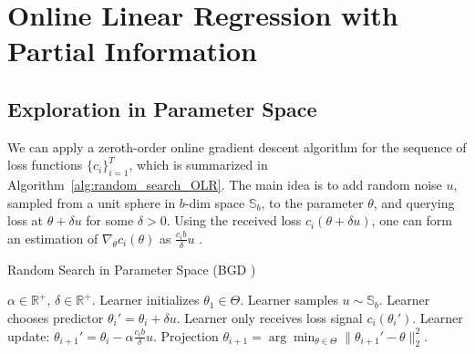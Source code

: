 \section{Online Linear Regression with Partial Information}
\label{sec:olr}
%
 

\subsection{Exploration in Parameter Space}
We can apply a zeroth-order
online gradient descent algorithm for the sequence of loss functions
$\{c_i\}_{i=1}^T$, which is summarized in
Algorithm~\ref{alg:random_search_OLR}. The main idea is to add random
noise $u$, sampled from a unit sphere in $b$-dim space $\mathbb{S}_{b}$, to the parameter $\theta$, and querying loss at $\theta+\delta u$ for some $\delta > 0$. Using the received loss $c_i(\theta+\delta u)$, one can form an estimation of $\nabla_{\theta}c_i(\theta)$ as $\frac{c_i b}{\delta}u$ \citep{flaxman2005online}. 

%

\begin{algorithm}[ht]
\caption{Random Search in Parameter Space (BGD \cite{flaxman2005online})}
 \label{alg:random_search_OLR}
\begin{algorithmic}[1]
   $\alpha\in\mathbb{R}^+$, $\delta\in\mathbb{R}^+$.
  \State Learner initializes $\theta_1\in\Theta$.
    \State Learner samples $u\sim \mathbb{S}_{b}$. 
    \State Learner chooses predictor $\theta_i' = \theta_i + \delta u$. 
    \State Learner only receives loss signal $c_i(\theta_i')$. %
    \State Learner update: $\theta_{i+1}' = \theta_i - \alpha \frac{c_i b}{\delta}u$.
    \State Projection $\theta_{i+1} = \arg\min_{\theta\in{\Theta}}\|\theta_{i+1}'-\theta\|_2^2$.
  \EndFor
\end{algorithmic}
\end{algorithm}


